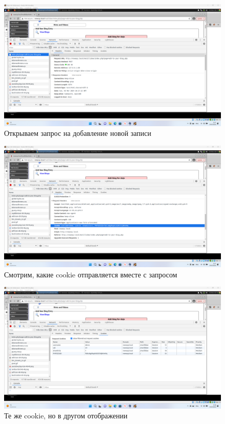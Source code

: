 \documentclass[a4paper]{article}
\begin{document}
  \begin{figure}[H]
    \centering
    \includegraphics[width=\textwidth]{Screenshot_28}
    \caption{Открываем запрос на добавление новой записи}
  \end{figure}

  \begin{figure}[H]
    \centering
    \includegraphics[width=\textwidth]{Screenshot_29}
    \caption{Смотрим, какие cookie отправляется вместе с запросом}
  \end{figure}

  \begin{figure}[H]
    \centering
    \includegraphics[width=\textwidth]{Screenshot_30}
    \caption{Те же cookie, но в другом отображении}
  \end{figure}
\end{document}
